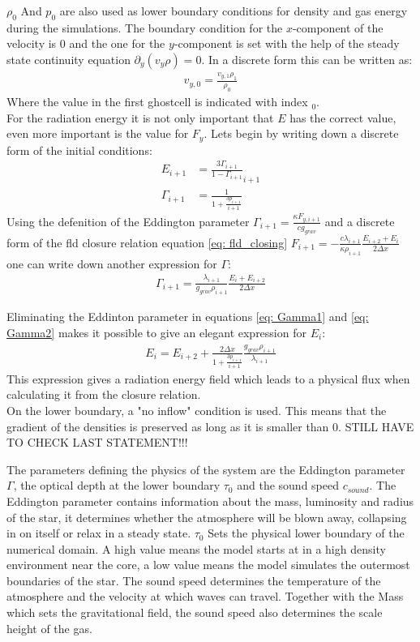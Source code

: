 $\rho_0$ And $p_0$ are also used as lower boundary conditions for density and gas energy during the simulations. The  boundary condition for the $x$-component of the velocity is $0$ and the one for the $y$-component is set with the help of the steady state continuity equation $\partial_y(v_y \rho) = 0$. In a discrete form this can be written as:
\begin{align}
v_{y,0} = \frac{v_{y,1} \rho_1}{\rho_0}
\end{align}
Where the value in the first ghostcell is indicated with index $_0$.\\
For the radiation energy it is not only important that $E$ has the correct value, even more important is the value for $F_y$. Lets begin by writing down a discrete form of the initial conditions:
\begin{align}
E_{i+1} &= \frac{3 \Gamma_{i+1}}{1-\Gamma_{i+1}}_{i+1} \\
\Gamma_{i+1} &= \frac{1}{1 + \frac{3 p_{i+1}}{i+1}} \label{eq: Gamma1}
\end{align}
Using the defenition of the Eddington parameter $\Gamma_{i+1} = \frac{\kappa F_{y,i+1}}{c g_{grav}}$ and a discrete form of the fld closure relation equation \eqref{eq: fld_closing} $F_{i+1} = -\frac{c \lambda_{i+1}}{\kappa \rho_{i+1}} \frac{E_{i+2} + E_{i}}{2 \Delta x}$ one can write down another expression for $\Gamma$:
\begin{align}
\Gamma_{i+1} = \frac{\lambda_{i+1}}{g_{grav}\rho_{i+1}}\frac{E_i + E_{i+2}}{2 \Delta x} \label{eq: Gamma2}
\end{align}

Eliminating the Eddinton parameter in equations \ref{eq: Gamma1} and \eqref{eq: Gamma2} makes it possible to give an elegant expression for $E_i$:
\begin{align}
E_i = E_{i+2} + \frac{2 \Delta x}{1 + \frac{3 p_{i+1}}{i+1}}  \frac{g_{grav} \rho_{i+1}}{\lambda_{i+1}}  
\end{align}
This expression gives a radiation energy field which leads to a physical flux when calculating it from the closure relation. \\
On the lower boundary, a "no inflow" condition is used. This means that the gradient of the densities is preserved as long as it is smaller than $0$. STILL HAVE TO CHECK LAST STATEMENT!!!


The parameters defining the physics of the system are the Eddington parameter $\Gamma$, the optical depth at the lower boundary $\tau_0$ and the sound speed $c_{sound}$. The Eddington parameter contains information about the mass, luminosity and radius of the star, it determines whether the atmosphere will be blown away, collapsing in on itself or relax in a steady state. $\tau_0$ Sets the physical lower boundary of the numerical domain. A high value means the model starts at in a high density environment near the core, a low value means the model simulates the outermost boundaries of the star. The sound speed determines the temperature of the atmosphere and the velocity at which waves can travel. Together with the Mass which sets the gravitational field, the sound speed also determines the scale height of the gas. \\

